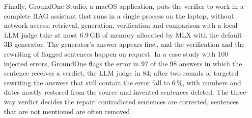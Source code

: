 Finally, GroundOne Studio, a macOS application, puts the verifier to work in a complete RAG assistant that runs in a
single process on the laptop, without network access: retrieval, generation, verification and comparison with a local
LLM judge take at most 6.9\,GB of memory allocated by MLX with the default 3B generator. The generator's answer appears first, and the
verification and the rewriting of flagged sentences happen on request. In a case study with 100 injected errors,
GroundOne flags the error in 97 of the 98 answers in which the sentence receives a verdict, the LLM judge in 84; after two
rounds of targeted rewriting the answers that still contain the error fall to 6\,\%, with numbers and dates mostly
restored from the source and invented sentences deleted. The three-way verdict decides the repair: contradicted
sentences are corrected, sentences that are not mentioned are often removed.
